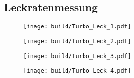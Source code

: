 \subsection{Leckratenmessung}
\begin{figure}[H]
    \centering
    \texttt{[image: build/Turbo\_Leck\_1.pdf]}
    \caption{}
    \label{fig:turbo_leck1}
\end{figure}
\noindent
\begin{figure}[H]
    \centering
    \texttt{[image: build/Turbo\_Leck\_2.pdf]}
    \caption{}
    \label{fig:turbo_leck2}
\end{figure}
\noindent
\begin{figure}[H]
    \centering
    \texttt{[image: build/Turbo\_Leck\_3.pdf]}
    \caption{}
    \label{fig:turbo_leck3}
\end{figure}
\noindent
\begin{figure}[H]
    \centering
    \texttt{[image: build/Turbo\_Leck\_4.pdf]}
    \caption{}
    \label{fig:turbo_leck4}
\end{figure}
\noindent